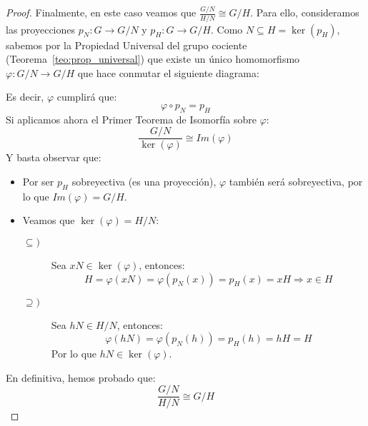 \begin{teo}
\begin{proof}
        \noindent
        Finalmente, en este caso veamos que $\frac{G/N}{H/N}\cong G/H$. Para ello, consideramos las proyecciones $p_N:G\to G/N$ y $p_H:G\to G/H$. Como $N\subseteq H = \ker(p_H)$, sabemos por la Propiedad Universal del grupo cociente (Teorema~\ref{teo:prop_universal}) que existe un único homomorfismo $\varphi:G/N\to G/H$ que hace conmutar el siguiente diagrama:
        \begin{figure}[H]
            \centering
        \end{figure}
        Es decir, $\varphi$ cumplirá que:
        \begin{equation*}
            \varphi \circ p_N = p_H
        \end{equation*}
        Si aplicamos ahora el Primer Teorema de Isomorfía sobre $\varphi$:
        \begin{equation*}
            \dfrac{G/N}{\ker(\varphi)} \cong Im(\varphi)
        \end{equation*}
        Y basta observar que:
        \begin{itemize}
            \item Por ser $p_H$ sobreyectiva (es una proyección), $\varphi$ también será sobreyectiva, por lo que $Im(\varphi) = G/H$.
            \item Veamos que $\ker(\varphi) = H/N$:
                \begin{description}
                    \item [$\subseteq)$] Sea $xN\in \ker(\varphi)$, entonces:
                        \begin{equation*}
                            H = \varphi(xN) = \varphi(p_N(x)) = p_H(x) = xH \Longrightarrow x\in H
                        \end{equation*}
                    \item [$\supseteq)$] Sea $hN\in H/N$, entonces:
                        \begin{equation*}
                            \varphi(hN) = \varphi(p_N(h)) = p_H(h) = hH = H 
                        \end{equation*}
                        Por lo que $hN \in \ker(\varphi)$.
                \end{description}
        \end{itemize}
        En definitiva, hemos probado que:
        \begin{equation*}
            \dfrac{G/N}{H/N} \cong G/H
        \end{equation*}
    \end{proof}
\end{teo}

